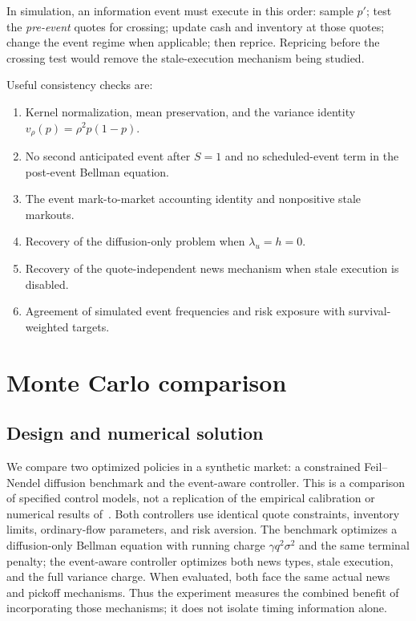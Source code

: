 \documentclass[11pt]{article}
\newcommand{\1}{\mathbf 1}
\begin{document}
In simulation, an information event must execute in this order: sample $p'$;
test the \emph{pre-event} quotes for crossing; update cash and inventory at those
quotes; change the event regime when applicable; then reprice. Repricing before
the crossing test would remove the stale-execution mechanism being studied.

Useful consistency checks are:
\begin{enumerate}
 \item Kernel normalization, mean preservation, and the variance identity
       $v_\rho(p)=\rho^2p(1-p)$.
 \item No second anticipated event after $S=1$ and no scheduled-event term
       in the post-event Bellman equation.
 \item The event mark-to-market accounting identity and nonpositive stale markouts.
 \item Recovery of the diffusion-only problem when $\lambda_u=h=0$.
 \item Recovery of the quote-independent news mechanism when stale execution is disabled.
 \item Agreement of simulated event frequencies and risk exposure with survival-weighted targets.
\end{enumerate}

\section{Monte Carlo comparison}
\label{sec:mc}
\subsection{Design and numerical solution}
We compare two optimized policies in a synthetic market: a constrained
Feil--Nendel diffusion benchmark and the event-aware controller. This is a
comparison of specified control models, not a replication of the empirical
calibration or numerical results of~\cite{feilnendel2026}. Both controllers use
identical quote constraints, inventory limits, ordinary-flow parameters, and
risk aversion. The benchmark optimizes a diffusion-only Bellman equation with
running charge $\gamma q^2\sigma^2$ and the same terminal penalty; the event-aware
controller optimizes both news types, stale execution, and the full variance
charge. When evaluated, both face the same actual news and pickoff mechanisms.
Thus the experiment measures the combined benefit of incorporating those
mechanisms; it does not isolate timing information alone.
\end{document}
